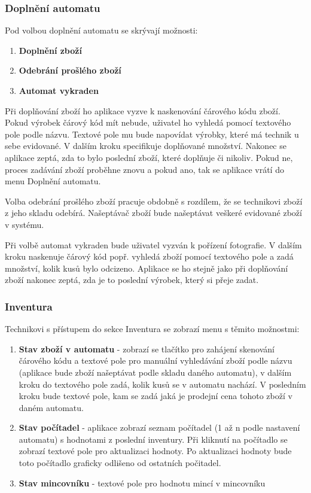 \documentclass[a4paper,10pt]{article}
\begin{document}
\subsubsection{Doplnění automatu}
Pod volbou doplnění automatu se skrývají možnosti:
\begin{enumerate}
	\item \textbf{Doplnění zboží}
	\item \textbf{Odebrání prošlého zboží}
	\item \textbf{Automat vykraden}
\end{enumerate}

Při doplňování zboží ho aplikace vyzve k naskenování čárového kódu zboží. Pokud výrobek čárový kód mít nebude, uživatel ho vyhledá pomocí textového pole podle názvu. Textové pole mu bude napovídat výrobky, které má technik u sebe evidované. V dalším kroku specifikuje doplňované množství. Nakonec se aplikace zeptá, zda to bylo poslední zboží, které doplňuje či nikoliv. Pokud ne, proces zadávání zboží proběhne znovu a pokud ano, tak se aplikace vrátí do menu Doplnění automatu.

Volba odebrání prošlého zboží pracuje obdobně s rozdílem, že se technikovi zboží z jeho skladu odebírá. Našeptávač zboží bude našeptávat veškeré evidované zboží v systému.

Při volbě automat vykraden bude uživatel vyzván k pořízení fotografie. V dalším kroku naskenuje čárový kód popř. vyhledá zboží pomocí textového pole a zadá množství, kolik kusů bylo odcizeno. Aplikace se ho stejně jako při doplňování zboží nakonec zeptá, zda je to poslední výrobek, který si přeje zadat.

\subsubsection{Inventura}
Technikovi s přístupem do sekce Inventura se zobrazí menu s těmito možnostmi:
\begin{enumerate}
	\item \textbf{Stav zboží v automatu} - zobrazí se tlačítko pro zahájení skenování čárového kódu a textové pole pro manuální vyhledávání zboží podle názvu (aplikace bude zboží našeptávat podle skladu daného automatu), v dalším kroku do textového pole zadá, kolik kusů se v automatu nachází. V posledním kroku bude textové pole, kam se zadá jaká je prodejní cena tohoto zboží v daném automatu.
	\item \textbf{Stav počítadel} - aplikace zobrazí seznam počítadel (1 až n podle nastavení automatu) s hodnotami z poslední inventury. Při kliknutí na počítadlo se zobrazí textové pole pro aktualizaci hodnoty. Po aktualizaci hodnoty bude toto počítadlo graficky odlišeno od ostatních počitadel.
	\item \textbf{Stav mincovníku} - textové pole pro hodnotu mincí v mincovníku
\end{enumerate}
\end{document}
